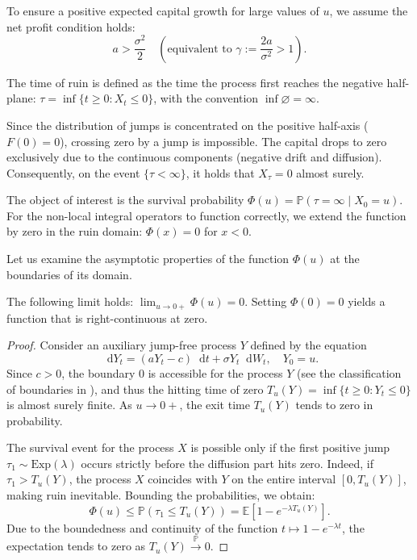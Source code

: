 \documentclass[smallextended]{svjour3}
\providecommand{\diff}{\mathop{}\!\mathrm{d}}
\begin{document}
To ensure a positive expected capital growth for large values of $u$, we assume the net profit condition holds:
\begin{equation}
\label{eq:net_profit}
a > \frac{\sigma^2}{2} \quad \left(\text{equivalent to } \gamma := \frac{2a}{\sigma^2} > 1\right).
\end{equation}

The time of ruin is defined as the time the process first reaches the negative half-plane:
$\tau = \inf\{t \ge 0 : X_t \le 0\}$, with the convention $\inf \varnothing = \infty$.

Since the distribution of jumps is concentrated on the positive half-axis ($F(0)=0$), crossing zero by a jump is impossible. The capital drops to zero exclusively due to the continuous components (negative drift and diffusion). Consequently, on the event $\{\tau < \infty\}$, it holds that $X_\tau = 0$ almost surely.

The object of interest is the survival probability $\Phi(u) = \mathbb{P}(\tau = \infty \mid X_0 = u)$. For the non-local integral operators to function correctly, we extend the function by zero in the ruin domain: $\Phi(x) = 0$ for $x < 0$. 

Let us examine the asymptotic properties of the function $\Phi(u)$ at the boundaries of its domain.

\begin{lemma}
\label{lem:boundary_zero}
The following limit holds: $\lim_{u \to 0+} \Phi(u) = 0$. Setting $\Phi(0)=0$ yields a function that is right-continuous at zero.
\end{lemma}

\begin{proof}
Consider an auxiliary jump-free process $Y$ defined by the equation 
$$\diff Y_t = (a Y_t - c)\diff t + \sigma Y_t \diff W_t, \quad Y_0=u.$$
Since $c>0$, the boundary $0$ is accessible for the process $Y$ (see the classification of boundaries in \cite[Part II, Sec. 13]{Borodin2002}), and thus the hitting time of zero $T_u(Y) = \inf\{t \ge 0 : Y_t \le 0\}$ is almost surely finite. As $u \to 0+$, the exit time $T_u(Y)$ tends to zero in probability.

The survival event for the process $X$ is possible only if the first positive jump $\tau_1 \sim \text{Exp}(\lambda)$ occurs strictly before the diffusion part hits zero. Indeed, if $\tau_1 > T_u(Y)$, the process $X$ coincides with $Y$ on the entire interval $[0, T_u(Y)]$, making ruin inevitable. Bounding the probabilities, we obtain:
$$ \Phi(u) \le \mathbb{P}(\tau_1 \le T_u(Y)) = \mathbb{E}[1 - e^{-\lambda T_u(Y)}]. $$
Due to the boundedness and continuity of the function $t \mapsto 1 - e^{-\lambda t}$, the expectation tends to zero as $T_u(Y) \xrightarrow{\mathbb{P}} 0$.
\end{proof}
\end{document}
